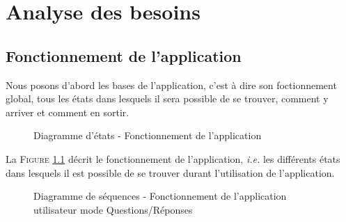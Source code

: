 \chapter{Analyse des besoins}

\section{Fonctionnement de l'application}

Nous posons d'abord les bases de l'application, c'est à dire son foctionnement global, tous les états dans lesquels il sera possible de se trouver, comment y arriver et comment en sortir.

 \begin{figure}[!ht]
 \begin{center}
  \caption{Diagramme d'états - Fonctionnement de l'application}
  \label{etattrans}
 \end{center}
 \end{figure}


 La \textsc{Figure} \ref{etattrans} décrit le fonctionnement de l'application, \textit{i.e.} les différents états dans lesquels il est possible de se trouver durant l'utilisation de l'application.


 \begin{figure}[!ht]
 \begin{center}
  \caption{Diagramme de séquences - Fonctionnement de l’application utilisateur mode Questions/Réponses}
  \label{sequence}
 \end{center}
 \end{figure}

